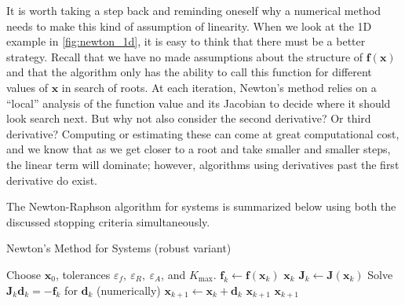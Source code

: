 It is worth taking a step back and reminding oneself why a numerical method needs to make this kind of assumption of linearity. When we look at the 1D example in \autoref{fig:newton_1d}, it is easy to think that there must be a better strategy. Recall that we have no made assumptions about the structure of $\mathbf f(\mathbf x)$ and that the algorithm only has the ability to call this function for different values of $\mathbf x$ in search of roots. At each iteration, Newton's method relies on a ``local'' analysis of the function value and its Jacobian to decide where it should look search next. But why not also consider the second derivative? Or third derivative? Computing or estimating these can come at great computational cost, and we know that as we get closer to a root and take smaller and smaller steps, the linear term will dominate; however, algorithms using derivatives past the first derivative do exist.


The Newton-Raphson algorithm for systems is summarized below using both the discussed stopping criteria simultaneously.

\begin{algorithm}[H]
    \caption{Newton's Method for Systems (robust variant)}
    \begin{algorithmic}[1]
    \State Choose $\mathbf{x}_0$, tolerances $\varepsilon_f,\ \varepsilon_R,\ \varepsilon_A$, and $K_{\max}$.
        \State $\mathbf{f}_k \gets \mathbf{f}(\mathbf{x}_k)$
            \State \Return $\mathbf{x}_k$ 
        \EndIf
        \State $\mathbf{J}_k \gets \mathbf{J}(\mathbf{x}_k)$
        \State Solve $\mathbf{J}_k \mathbf{d}_k = -\mathbf{f}_k$ for $\mathbf{d}_k$ (numerically)
        \State $\mathbf{x}_{k+1} \gets \mathbf{x}_k + \mathbf{d}_k$
            \State \Return $\mathbf{x}_{k+1}$ 
        \EndIf
    \EndFor
    \State \Return $\mathbf{x}_{k+1}$ 
    \end{algorithmic}
\end{algorithm}

